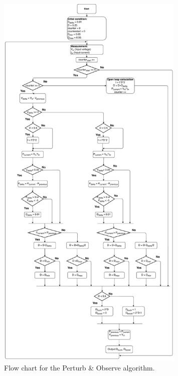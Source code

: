 \begin{figure}[H]
	\begin{center}
		\includegraphics[width=0.8\textwidth]{../Pictures/P1/Flow_chart/2018_11_15_Flow_chart_MPPT_Buck-Boost_converter}
		\caption{Flow chart for the Perturb \& Observe algorithm.}
		\label{fcfinal} 
	\end{center}	
\end{figure}

